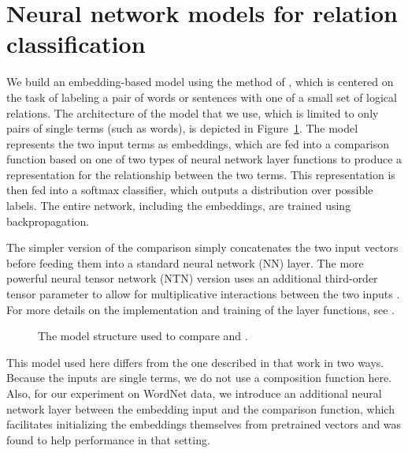 
\section{Neural network models for relation classification} \label{methods}

We build an embedding-based model using the method of
\cite{Bowman:Potts:Manning:2014}, which is centered on the task of
labeling a pair of words or sentences with one of a small set of
logical relations. The architecture of the model that we use, which is
limited to only pairs of single terms (such as words), is depicted
in Figure~\ref{sample-figure}. The model represents the two input
terms as embeddings, which are fed into a comparison function based
on one of two types of neural network layer functions to produce a
representation for the relationship between the two terms. This
representation is then fed into a softmax classifier, which outputs a
distribution over possible labels. The entire network, including the
embeddings, are trained using backpropagation. 

The simpler version of the comparison simply concatenates the two
input vectors before feeding them into a standard neural network (NN)
layer.  The more powerful neural tensor network (NTN) version uses an
additional third-order tensor parameter to allow for multiplicative
interactions between the two inputs \cite{chen2013learning}. For more
details on the implementation and training of the layer functions, see
\cite{Bowman:Potts:Manning:2014}.

\begin{figure}[tp]
  \centering
  
  \caption{The model structure used to compare  and .} 
  \label{sample-figure}
\end{figure}

This model used here differs from the one described in that work in
two ways. Because the inputs are single terms, we do not use
a composition function here. Also, for our experiment on WordNet data, 
we introduce an additional neural network layer between the embedding 
input and the comparison function, which facilitates initializing the 
embeddings themselves from pretrained vectors and was found to help 
performance in that setting.



